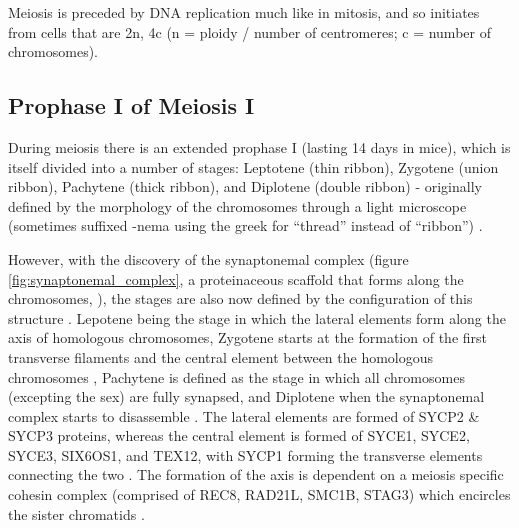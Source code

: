 Meiosis is preceded by DNA replication much like in mitosis, and so initiates from cells that are 2n, 4c (n = ploidy / number of centromeres; c = number of chromosomes).

\subsection{Prophase I of Meiosis I}
During meiosis there is an extended prophase I (lasting 14 days in mice), which is itself divided into a number of stages: Leptotene (thin ribbon), Zygotene (union ribbon), Pachytene (thick ribbon), and Diplotene (double ribbon) - originally defined by the morphology of the chromosomes through a light microscope (sometimes suffixed -nema using the greek for ``thread'' instead of ``ribbon'') \parencite{DeWiniwarter1900Recherches, Gregoire1907formation, Wilson1912Studies, Zickler1998leptotenezygotene}.

However, with the discovery of the synaptonemal complex (figure \ref{fig:synaptonemal_complex}, a proteinaceous scaffold that forms along the chromosomes, \cite{Moses1956Chromosomal, Fawcett1956FINE}), the stages are also now defined by the configuration of this structure \parencite{Zickler2015Recombination}.
Lepotene being the stage in which the lateral elements form along the axis of homologous chromosomes, Zygotene starts at the formation of the first transverse filaments and the central element between the homologous chromosomes \parencite{Moens1968structure}, Pachytene is defined as the stage in which all chromosomes (excepting the sex) are fully synapsed, and Diplotene when the synaptonemal complex starts to disassemble \parencite{Moses1958Relation, Moses1977Synaptonemal}.
The lateral elements are formed of SYCP2 \& SYCP3 proteins, whereas the central element is formed of SYCE1, SYCE2, SYCE3, SIX6OS1, and TEX12, with SYCP1 forming the transverse elements connecting the two \parencite[reviewed in][]{Zickler2015Recombination, Gao2018Zipping, Kaniecki2018change, Dunce2018Structural}.
The formation of the axis is dependent on a meiosis specific cohesin complex (comprised of REC8, RAD21L, SMC1B, STAG3) which encircles the sister chromatids \parencite[reviewed in][]{Rankin2015Complex, Ishiguro2019cohesin}.

